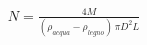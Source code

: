 \documentclass[preview]{standalone}
\begin{document}
\begin{align*}
N = \tfrac{4M}{(\rho_{acqua}-\rho_{legno})\,\pi D^2 L}
\end{align*}
\end{document}
